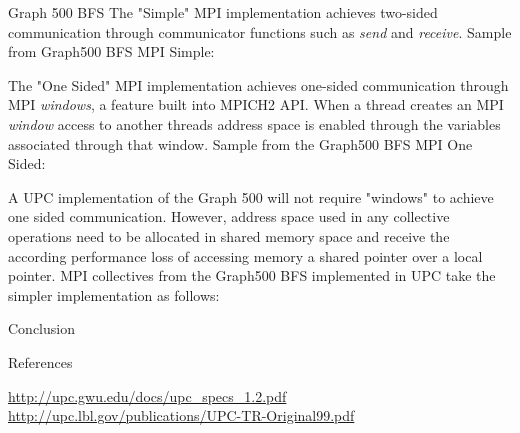 \documentclass[final]{beamer}
\begin{document}
\begin{frame}[t]
\begin{columns}[t]
\begin{column}{0.28\paperwidth}
\begin{block}{Graph 500 BFS}
					The "Simple" MPI implementation achieves two-sided communication through communicator functions such as  \emph{send} and \emph{receive}. Sample from Graph500 BFS MPI Simple:\vspace{2 mm}
					
					 \vspace{5 mm}
					  The "One Sided" MPI implementation achieves one-sided communication through MPI \emph{windows}, a feature built into MPICH2 API.  When a thread creates an MPI \emph{window} access to another threads address space is enabled through the variables associated through that window.  Sample from the Graph500 BFS MPI One Sided: 
					  \vspace{2 mm}
					   
					  \vspace{5 mm}
					  A UPC implementation of the Graph 500 will not require "windows" to achieve one sided communication.  However, address space used in any collective operations need to be allocated in shared memory space and receive the according performance loss of accessing memory a shared pointer over a local pointer.  MPI collectives from the Graph500 BFS implemented in UPC take the simpler implementation as follows: 
					  \vspace{2 mm}
					   
				\end{block}
				\begin{block}{Conclusion}
				\end{block}
				\begin{block}{References}
					\begin{thebibliography}{7}
						{\small
							\url{http://upc.gwu.edu/docs/upc_specs_1.2.pdf}
							  \url{http://upc.lbl.gov/publications/UPC-TR-Original99.pdf}
						}
					\end{thebibliography}
				\end{block}
			\end{column}
		\end{columns}
	\end{frame}
\end{document}
